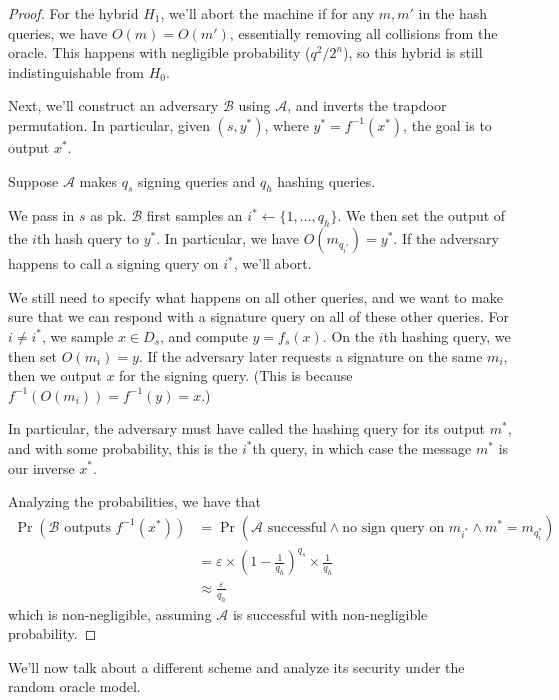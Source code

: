 \documentclass[12pt]{tufte-book}
\begin{document}
\begin{proof}
    For the hybrid $H_1$, we'll abort the machine if for any $m, m'$ in the hash queries, we have $O(m) = O(m')$, essentially removing all collisions from the oracle. This happens with negligible probability ($q^2 / 2^n$), so this hybrid is still indistinguishable from $H_0$.

    Next, we'll construct an adversary $\mathcal{B}$ using $\mathcal{A}$, and inverts the trapdoor permutation. In particular, given $(s, y^*)$, where $y^* = f^{-1}(x^*)$, the goal is to output $x^*$.

    Suppose $\mathcal{A}$ makes $q_s$ signing queries and $q_h$ hashing queries.

    We pass in $s$ as $\mathrm{pk}$. $\mathcal{B}$ first samples an $i^* \gets \{1, \ldots, q_h\}$. We then set the output of the $i$th hash query to $y^*$. In particular, we have $O(m_{q_{i^*}}) = y^*$. If the adversary happens to call a signing query on $i^*$, we'll abort.

    We still need to specify what happens on all other queries, and we want to make sure that we can respond with a signature query on all of these other queries. For $i \ne i^*$, we sample $x \in D_s$, and compute $y = f_s(x)$. On the $i$th hashing query, we then set $O(m_i) = y$. If the adversary later requests a signature on the same $m_i$, then we output $x$ for the signing query. (This is because $f^{-1}(O(m_i)) = f^{-1}(y) = x$.)

    In particular, the adversary must have called the hashing query for its output $m^*$, and with some probability, this is the $i^*$th query, in which case the message $m^*$ is our inverse $x^*$.

    Analyzing the probabilities, we have that
    \begin{align*}
        \Pr(\text{$\mathcal{B}$ outputs $f^{-1}(x^*)$})
            &= \Pr(\text{$\mathcal{A}$ successful} \land \text{no sign query on $m_{i^*}$} \land m^* = m_{q_i^*}) \\
            &= \varepsilon \times \left(1 - \frac{1}{q_h}\right)^{q_s} \times \frac{1}{q_h} \\
            &\approx \frac{\varepsilon}{q_h}
    \end{align*}
    which is non-negligible, assuming $\mathcal{A}$ is successful with non-negligible probability.
\end{proof}

We'll now talk about a different scheme and analyze its security under the random oracle model.
\end{document}
